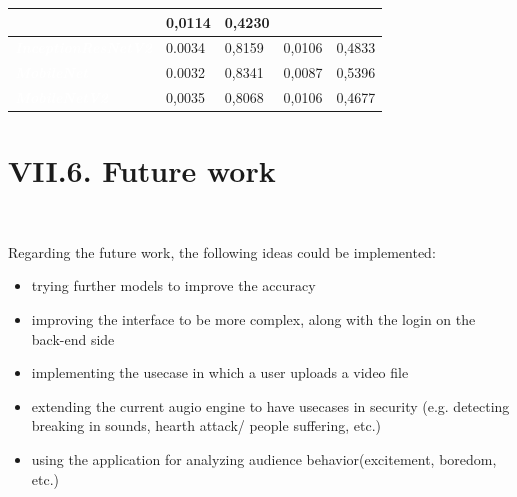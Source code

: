 \documentclass[11pt, a4papper]{report}
\theoremstyle{plain}
\theoremstyle{definition}
\theoremstyle{definition}
\theoremstyle{proposition}
\begin{document}
\begin{center}
\begin{footnotesize}
\begin{tabular}{ | M{4.6cm} | m{2cm} | m{2cm} |m{2cm} | m{2cm}}
&   {0,0114} 
&   {0,4230}  \\
\hline
{}
\textit{\textbf{\textcolor{white}{InceptionResNetV2}}}&   {0.0034} &   {0,8159} 
&   {0,0106} 
&   {0,4833}  \\
\hline
{}
\textit{\textbf{\textcolor{white}{MobileNet}}}&   {0.0032} &   {0,8341} 
&   {0,0087} 
&   {0,5396}  \\
\hline
{}
\textit{\textbf{\textcolor{white}{MobileNetV2}}}&   {0,0035} &   {0,8068} 
&   {0,0106} 
&   {0,4677}  \\
\hline
\end{tabular}
\end{footnotesize}
\end{center}

\section*{VII.6. Future work}
\

Regarding the future work, the following ideas could be implemented:
\begin{itemize}
\item trying further models to improve the accuracy
\item improving the interface to be more complex, along with the login on the back-end side
\item implementing the usecase in which a user uploads a video file
\item extending the current augio engine to have usecases in security (e.g. detecting breaking in sounds, hearth attack/ people suffering, etc.)
\item using the application for analyzing audience behavior(excitement, boredom, etc.)
\end{itemize}
\end{document}
